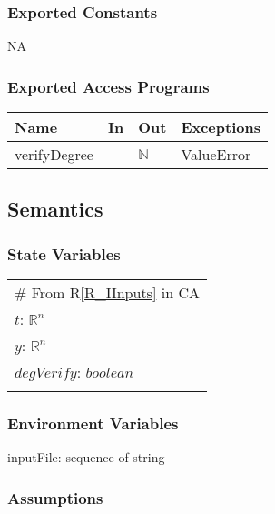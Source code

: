 \documentclass[12pt, titlepage]{article}
\begin{document}
\subsubsection{Exported Constants}
NA

\subsubsection{Exported Access Programs}

\begin{center}
	\begin{tabular}{p{2cm} p{4cm} p{4cm} p{2cm}}
		\hline
		\textbf{Name} & \textbf{In} & \textbf{Out} & \textbf{Exceptions} \\
		\hline
		verifyDegree &  &  $\mathbb{N}$  & ValueError \\
		\hline
	\end{tabular}
\end{center}
\subsection{Semantics}

\subsubsection{State Variables}

\renewcommand{\arraystretch}{1.2}
\begin{longtable*}[l]{l} 
	\# From R\ref{R_IInputs} in CA\\
	$t$: $\mathbb{R}^n$ \\
	$y$: $\mathbb{R}^n$ \\
	$degVerify$: $boolean$\\ 
	
	
\end{longtable*}


\subsubsection{Environment Variables}


inputFile: sequence of string

\subsubsection{Assumptions}
\end{document}
